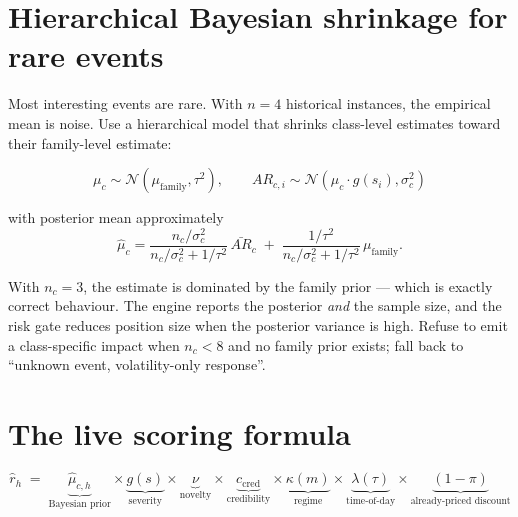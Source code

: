 \section{Hierarchical Bayesian shrinkage for rare events}

Most interesting events are rare. With $n=4$ historical instances, the empirical
mean is noise. Use a hierarchical model that shrinks class-level estimates
toward their family-level estimate:

\[
\mu_c \sim \mathcal{N}(\mu_{\text{family}}, \tau^2), \qquad
AR_{c,i} \sim \mathcal{N}(\mu_c \cdot g(s_i), \sigma_c^2)
\]

with posterior mean approximately
\[
\hat\mu_c = \frac{n_c/\sigma_c^2}{n_c/\sigma_c^2 + 1/\tau^2}\,\bar{AR}_c
\;+\; \frac{1/\tau^2}{n_c/\sigma_c^2 + 1/\tau^2}\,\mu_{\text{family}} .
\]

\begin{keybox}[title={Practical consequence}]
With $n_c = 3$, the estimate is dominated by the family prior --- which is
exactly correct behaviour. The engine reports the posterior \emph{and} the
sample size, and the risk gate reduces position size when the posterior variance
is high. Refuse to emit a class-specific impact when $n_c < 8$ and no family
prior exists; fall back to ``unknown event, volatility-only response''.
\end{keybox}

\section{The live scoring formula}

\[
\hat{r}_h \;=\; \underbrace{\hat\mu_{c,h}}_{\text{Bayesian prior}}
\times \underbrace{g(s)}_{\text{severity}}
\times \underbrace{\nu}_{\text{novelty}}
\times \underbrace{c_{\text{cred}}}_{\text{credibility}}
\times \underbrace{\kappa(m)}_{\text{regime}}
\times \underbrace{\lambda(\tau)}_{\text{time-of-day}}
\times \underbrace{(1-\pi)}_{\text{already-priced discount}}
\]

